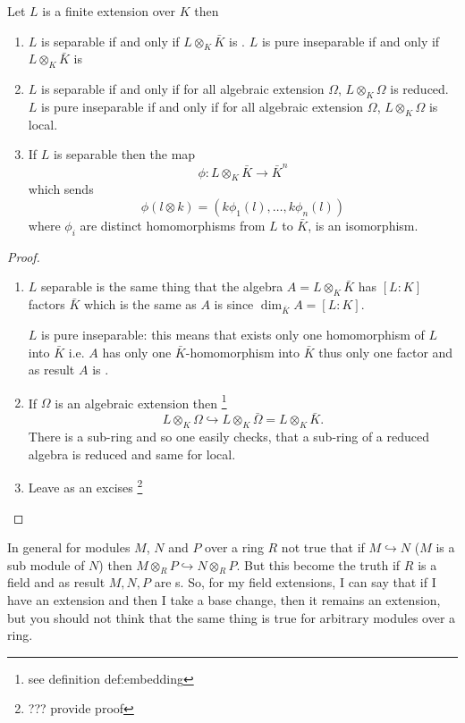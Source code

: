 \begin{theorem}
  Let $L$ is a finite extension over $K$ then
  \begin{enumerate}
  \item $L$ is separable if and only if $L \otimes_K \bar{K}$
    is .
    $L$ is pure inseparable if and only if $L \otimes_K \bar{K}$
    is 
  \item $L$ is separable if and only if for all algebraic extension
    $\Omega$, $L \otimes_K \Omega$ is reduced.
    $L$ is pure inseparable if and only if for all algebraic extension
    $\Omega$, $L \otimes_K \Omega$ is local.
  \item If $L$ is separable then the map
    \[
    \phi: L \otimes_K \bar{K} \to \bar{K}^n
    \]
    which sends
    \[
    \phi\left(l \otimes k\right) =
    \left(
    k \phi_1\left(l\right),
    \dots,
    k \phi_n\left(l\right)
    \right)
    \]
    where $\phi_i$ are distinct homomorphisms from $L$ to $\bar{K}$, 
    is an isomorphism.
  \end{enumerate}
  \begin{proof}
    \begin{enumerate}
    \item $L$ separable is the same thing that the algebra
      $A = L\otimes_K \bar{K}$ has $\left[L:K\right]$ factors
      $\bar{K}$ which is the same as $A$ is 
      since $\dim_{\bar{K}} A = \left[L:K\right]$.

      $L$ is pure inseparable: this means that exists only one
      homomorphism of $L$ into $\bar{K}$ i.e. $A$ has only one
      $\bar{K}$-homomorphism into $\bar{K}$ thus only one factor and
      as result $A$ is .
    \item If $\Omega$ is an algebraic extension then
      \footnote {
        see definition {def:embedding}
      }
      \[
      L \otimes_K \Omega \hookrightarrow L \otimes_K \bar{\Omega} =
      L \otimes_K \bar{K}.
      \]
      There is a sub-ring and so one easily checks, that a sub-ring of
      a reduced algebra is reduced and same for local.  
    \item Leave as an excises
      \footnote{
        ??? provide proof
      }
    \end{enumerate}
  \end{proof}
  \label{thm:lec5_1}
\end{theorem}
\begin{remark}
In general for modules $M$, $N$ and $P$ over a ring $R$ not true that
if $M \hookrightarrow N$ ($M$ is a sub module of $N$) then
$M \otimes_R P \hookrightarrow N \otimes_R P$. But this become the
truth if $R$ is a field and as result $M,N,P$ are
s. So, for my field extensions, I can say
that if I have an extension and then I take a base change, then it
remains an extension, but  you should not think that the same thing is
true for arbitrary modules over a ring.  
\end{remark}

